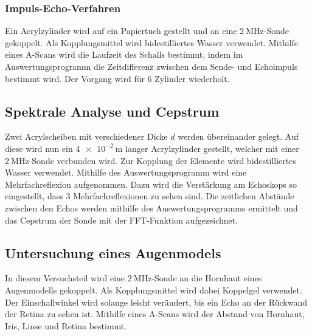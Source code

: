 \subsubsection{Impuls-Echo-Verfahren}
Ein Acrylzylinder wird auf ein Papiertuch gestellt und an eine $\SI{2}{\mega\hertz}$-Sonde gekoppelt. Als Kopplungsmittel wird bidestilliertes Wasser verwendet.
Mithilfe eines A-Scans wird die Laufzeit des Schalls bestimmt, indem im Auswertungsprogramm die Zeitdifferenz zwischen dem Sende- und Echoimpuls bestimmt wird.
Der Vorgang wird für $6$ Zylinder wiederholt.

\subsection{Spektrale Analyse und Cepstrum}
Zwei Acrylscheiben mit verschiedener Dicke $d$ werden übereinander gelegt. Auf diese wird nun ein $\SI{4e-2}{\metre}$ langer Acrylzylinder gestellt, welcher
mit einer $\SI{2}{\mega\hertz}$-Sonde verbunden wird.
Zur Kopplung der Elemente wird bidestilliertes Wasser verwendet.
Mithilfe des Auswertungsprogramm wird eine Mehrfachreflexion aufgenommen. Dazu wird die Verstärkung am Echoskops so eingestellt, dass 3 Mehrfachreflexionen zu sehen sind.
Die zeitlichen Abstände zwischen den Echos werden mithilfe des Auswertungsprogramms ermittelt und das Cepstrum der Sonde mit der FFT-Funktion aufgezeichnet.

\subsection{Untersuchung eines Augenmodels}
In diesem Versuchsteil wird eine $\SI{2}{\mega\hertz}$-Sonde an die Hornhaut eines Augenmodells gekoppelt. Als Kopplungsmittel wird dabei Koppelgel verwendet.
Der Einschallwinkel wird solange leicht verändert, bis ein Echo an der Rückwand der Retina zu sehen ist.
Mithilfe eines A-Scans wird der Abstand von Hornhaut, Iris, Linse und Retina bestimmt.

